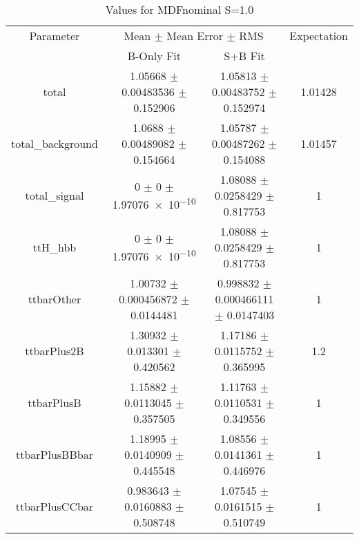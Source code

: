 \begin{table}
\centering
\caption{Values for MDFnominal S=1.0}
\begin{tabular}{cccc}
\toprule
Parameter & \multicolumn{2}{c}{Mean $\pm$ Mean Error $\pm$ RMS} & Expectation\\
 & B-Only Fit & S+B Fit & \\
\midrule
total & \num{1.05668} $\pm$ \num{0.00483536} $\pm$ \num{0.152906} & \num{1.05813} $\pm$ \num{0.00483752} $\pm$ \num{0.152974} & \num{1.01428}\\
total\_background & \num{1.0688} $\pm$ \num{0.00489082} $\pm$ \num{0.154664} & \num{1.05787} $\pm$ \num{0.00487262} $\pm$ \num{0.154088} & \num{1.01457}\\
total\_signal & \num{0} $\pm$ \num{0} $\pm$ \num{1.97076e-10} & \num{1.08088} $\pm$ \num{0.0258429} $\pm$ \num{0.817753} & \num{1}\\
ttH\_hbb & \num{0} $\pm$ \num{0} $\pm$ \num{1.97076e-10} & \num{1.08088} $\pm$ \num{0.0258429} $\pm$ \num{0.817753} & \num{1}\\
ttbarOther & \num{1.00732} $\pm$ \num{0.000456872} $\pm$ \num{0.0144481} & \num{0.998832} $\pm$ \num{0.000466111} $\pm$ \num{0.0147403} & \num{1}\\
ttbarPlus2B & \num{1.30932} $\pm$ \num{0.013301} $\pm$ \num{0.420562} & \num{1.17186} $\pm$ \num{0.0115752} $\pm$ \num{0.365995} & \num{1.2}\\
ttbarPlusB & \num{1.15882} $\pm$ \num{0.0113045} $\pm$ \num{0.357505} & \num{1.11763} $\pm$ \num{0.0110531} $\pm$ \num{0.349556} & \num{1}\\
ttbarPlusBBbar & \num{1.18995} $\pm$ \num{0.0140909} $\pm$ \num{0.445548} & \num{1.08556} $\pm$ \num{0.0141361} $\pm$ \num{0.446976} & \num{1}\\
ttbarPlusCCbar & \num{0.983643} $\pm$ \num{0.0160883} $\pm$ \num{0.508748} & \num{1.07545} $\pm$ \num{0.0161515} $\pm$ \num{0.510749} & \num{1}\\
\bottomrule
\end{tabular}
\end{table}